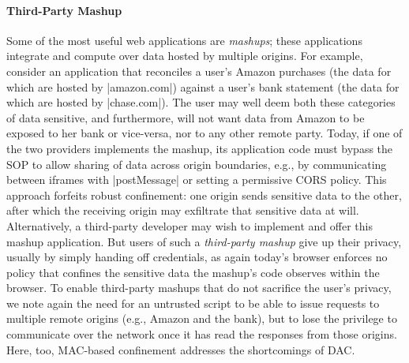
\paragraph{Third-Party Mashup}
Some of the most useful web applications are {\em mashups}; these
applications integrate and compute over data hosted by multiple
origins. For
example, consider an application that reconciles a user's Amazon
purchases (the data for which are hosted by \js|amazon.com|) against a
user's bank statement (the data for which are hosted by
\js|chase.com|). The user may well deem both these categories of data
sensitive, and furthermore, will not want data from Amazon to be
exposed to her bank or vice-versa, nor to any other remote
party. Today, if one of the two providers implements the mashup, its
application code must bypass the SOP to allow sharing of data across
origin boundaries, e.g., by communicating between iframes with
\js|postMessage| or setting a permissive CORS policy.
This approach forfeits robust confinement: one
origin sends sensitive data to the other, after which the receiving
origin may exfiltrate that sensitive data at will. Alternatively, a
third-party developer may wish to implement and offer this mashup
application. But users of such a {\em third-party mashup} give up
their privacy, usually by simply handing off credentials, as again today's browser enforces no policy that
confines the sensitive data the mashup's code observes within the
browser. To enable third-party mashups that do not sacrifice the
user's privacy, we note again the need for an untrusted script to be
able to issue requests to multiple remote origins (e.g., Amazon and
the bank), but to lose the privilege to communicate over the network
once it has read the responses from those origins. Here, too, MAC-based confinement
  addresses the shortcomings of DAC. 

